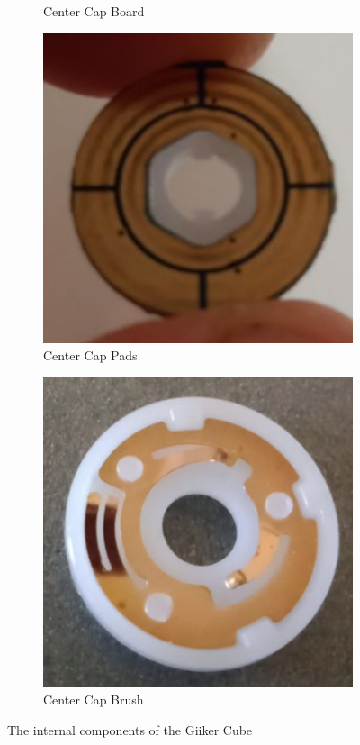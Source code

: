 \begin{figure}[h]
\begin{subfigure}{0.25\textwidth}
        \caption{Center Cap Board \cite{eggins-giiker-internals}}
        \label{fig:giiker-center-front}
    \end{subfigure}%
    \begin{subfigure}{0.25\textwidth}
        \centering
        \includegraphics[width=.90\linewidth]{Figures/3 State of the Art/giiker-center-pads.png}
        \caption{Center Cap Pads \cite{eggins-giiker-internals}}
        \label{fig:giiker-center-pads}
    \end{subfigure}%
    \begin{subfigure}{0.25\textwidth}
        \centering
        \includegraphics[width=.90\linewidth]{Figures/3 State of the Art/giiker-center-brush.png}
        \caption{Center Cap Brush \cite{eggins-giiker-internals}}
        \label{fig:giiker-center-brush}
    \end{subfigure}%
    \caption{The internal components of the Giiker Cube}
    \label{fig:giiker-internal-components}
\end{figure}

